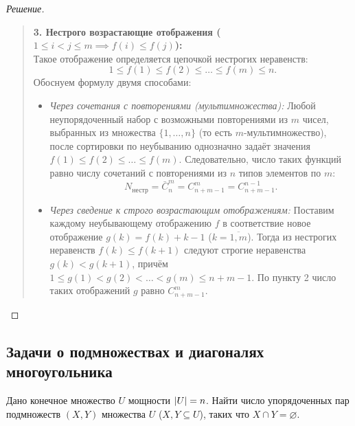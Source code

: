 \begin{proof}[Решение]
\begin{quote}
        \textbf{3. Нестрого возрастающие отображения ($1 \le i < j \le m \implies 
        f(i) \le f(j)$):}\\
        Такое отображение определяется цепочкой нестрогих неравенств:
        \[
            1 \le f(1) \le f(2) \le \dots \le f(m) \le n.
        \]
        Обоснуем формулу двумя способами:
        \begin{itemize}
            \item \emph{Через сочетания с повторениями (мультимножества):} 
            Любой неупорядоченный набор с возможными повторениями из $m$ 
            чисел, выбранных из множества $\{1, \dots, n\}$ (то есть 
            $m$-мультимножество), после сортировки по неубыванию 
            однозначно задаёт значения $f(1) \le f(2) \le \dots \le f(m)$. 
            Следовательно, число таких функций равно числу сочетаний с 
            повторениями из $n$ типов элементов по $m$:
            \begin{equation} \label{eq:map_weak_inc}
                N_{\text{нестр}} = \bar{C}_n^m = C_{n+m-1}^m = C_{n+m-1}^{n-1}. 
                \tag{6}
            \end{equation}
            \item \emph{Через сведение к строго возрастающим отображениям:} 
            Поставим каждому неубывающему отображению $f$ в соответствие 
            новое отображение $g(k) = f(k) + k - 1$ ($k = \overline{1, m}$). 
            Тогда из нестрогих неравенств $f(k) \le f(k + 1)$ следуют 
            строгие неравенства $g(k) < g(k + 1)$, причём 
            $1 \le g(1) < g(2) < \dots < g(m) \le n + m - 1$. По пункту 2 
            число таких отображений $g$ равно $C_{n+m-1}^m$.
        \end{itemize}
    \end{quote}
\end{proof}

\subsection{Задачи о подмножествах и диагоналях многоугольника}

\begin{problem}
    Дано конечное множество $U$ мощности $\left| U \right| = n$. Найти число 
    упорядоченных пар подмножеств $(X, Y)$ множества $U$ ($X, Y \subseteq U$), 
    таких что $X \cap Y = \varnothing$.
\end{problem}

